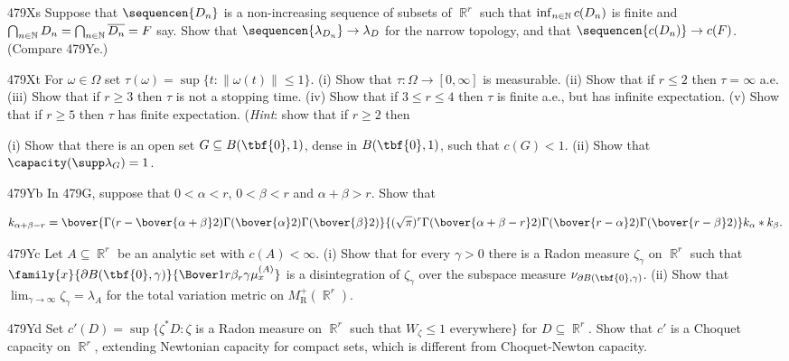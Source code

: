 {\spheader 479Xs Suppose that $\sequencen{D_n}$ is a non-increasing sequence
of subsets of $\BbbR^r$ such that $\inf_{n\in\Bbb N}c(D_n)$ is finite and
$\bigcap_{n\in\Bbb N}D_n=\bigcap_{n\in\Bbb N}\overline{D_n}=F$ say.   Show
that $\sequencen{\lambda_{D_n}}\to\lambda_D$ for the narrow topology, and
that $\sequencen{c(D_n)}\to c(F)$.   (Compare 479Ye.)

\spheader 479Xt For $\omega\in\Omega$ set
$\tau(\omega)=\sup\{t:\|\omega(t)\|\le 1\}$.   (i) Show that 
$\tau:\Omega\to[0,\infty]$ is measurable.
(ii) Show that if $r\le 2$ then $\tau=\infty$ a.e.   (iii) Show that if
$r\ge 3$ then $\tau$ is not a stopping time.   (iv) Show that if
$3\le r\le 4$ then $\tau$ is finite a.e., but has infinite expectation.
(v) Show that if $r\ge 5$ then $\tau$ has finite expectation.
({\it Hint\/}:  show that if $r\ge 2$ then


%
(i) Show that there is an open set $G\subseteq B(\tbf{0},1)$,
dense in $B(\tbf{0},1)$, such that $c(G)<1$.   (ii) Show that
$\capacity(\supp\lambda_G)=1$.

\spheader 479Yb In 479G, suppose that $0<\alpha<r$, $0<\beta<r$ and
$\alpha+\beta>r$.   Show that

$$k_{\alpha+\beta-r}
=\bover{\Gamma(r-\bover{\alpha+\beta}2)\Gamma(\bover{\alpha}2)
                  \Gamma(\bover{\beta}2)}
   {(\sqrt\pi)^r\Gamma(\bover{\alpha+\beta-r}2)\Gamma(\bover{r-\alpha}2)
                  \Gamma(\bover{r-\beta}2)}
   k_{\alpha}*k_{\beta}.$$

\spheader 479Yc Let $A\subseteq\BbbR^r$ be an analytic set with
$c(A)<\infty$.   (i) Show that for every $\gamma>0$ there is a Radon
measure $\zeta_{\gamma}$ on $\BbbR^r$ such that
$\family{x}{\partial B(\tbf{0},\gamma)}{\Bover1{r\beta_r\gamma}\mu^{(A)}_x}$ is a
disintegration of $\zeta_{\gamma}$ over the subspace measure
$\nu_{\partial B(\tbf{0},\gamma)}$.
(ii) Show that $\lim_{\gamma\to\infty}\zeta_{\gamma}=\lambda_A$ for the
total variation metric on $M^+_{\text{R}}(\BbbR^r)$.

\spheader 479Yd Set $c'(D)=\sup\{\zeta^*D:\zeta$ is a Radon measure on
$\BbbR^r$ such that $W_{\zeta}\le 1$ everywhere$\}$ for
$D\subseteq\BbbR^r$.   Show that $c'$ is a Choquet capacity on $\BbbR^r$,
extending Newtonian capacity for compact sets, which is different from
Choquet-Newton capacity.

}
